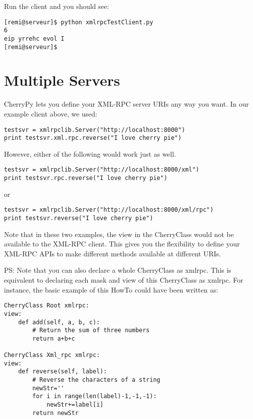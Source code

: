 \documentclass{manual}
\begin{document}
Run the client and you should see: 

\begin{verbatim}
[remi@serveur]$ python xmlrpcTestClient.py
6
eip yrrehc evol I
[remi@serveur]$
\end{verbatim}

\section{Multiple Servers}

CherryPy lets you define your XML-RPC server URIs any way you want. In
our example client above, we used:

\begin{verbatim}
testsvr = xmlrpclib.Server("http://localhost:8000")
print testsvr.xml.rpc.reverse("I love cherry pie")
\end{verbatim}

However, either of the following would work just as well.

\begin{verbatim}
testsvr = xmlrpclib.Server("http://localhost:8000/xml")
print testsvr.rpc.reverse("I love cherry pie")
\end{verbatim}

or

\begin{verbatim}
testsvr = xmlrpclib.Server("http://localhost:8000/xml/rpc")
print testsvr.reverse("I love cherry pie")
\end{verbatim}

Note that in these two examples, the  view in the  CherryClass
would not be available to the XML-RPC client. This gives you the
flexibility to define your XML-RPC APIs to make different methods
available at different URIs.

PS: Note that you can also declare a whole CherryClass as xmlrpc. This is equivalent to declaring each mask and view of this
CherryClass as xmlrpc. For instance, the basic example of this HowTo could have been written as:

\begin{verbatim}
CherryClass Root xmlrpc:
view:
    def add(self, a, b, c):
        # Return the sum of three numbers
        return a+b+c

CherryClass Xml_rpc xmlrpc:
view:
    def reverse(self, label):
        # Reverse the characters of a string
        newStr=''
        for i in range(len(label)-1,-1,-1):
            newStr+=label[i]
        return newStr
\end{verbatim}
\end{document}

